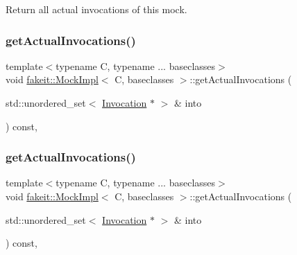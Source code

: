 Return all actual invocations of this mock. 

\mbox{\label{classfakeit_1_1MockImpl_a04c3121eb7d380226f1beabf4b18ee82}} 
\subsubsection{\texorpdfstring{getActualInvocations()}{getActualInvocations()}\hspace{0.1cm}{\footnotesize\ttfamily [2/9]}}
{\footnotesize\ttfamily template$<$typename C, typename ... baseclasses$>$ \\
void \mbox{\hyperlink{classfakeit_1_1MockImpl}{fakeit\+::\+Mock\+Impl}}$<$ C, baseclasses $>$\+::get\+Actual\+Invocations (\begin{DoxyParamCaption}\item[{std\+::unordered\+\_\+set$<$ \mbox{\hyperlink{structfakeit_1_1Invocation}{Invocation}} $\ast$ $>$ \&}]{into }\end{DoxyParamCaption}) const\hspace{0.3cm}{\ttfamily [inline]}, {\ttfamily [override]}}

\mbox{\label{classfakeit_1_1MockImpl_a04c3121eb7d380226f1beabf4b18ee82}} 
\subsubsection{\texorpdfstring{getActualInvocations()}{getActualInvocations()}\hspace{0.1cm}{\footnotesize\ttfamily [3/9]}}
{\footnotesize\ttfamily template$<$typename C, typename ... baseclasses$>$ \\
void \mbox{\hyperlink{classfakeit_1_1MockImpl}{fakeit\+::\+Mock\+Impl}}$<$ C, baseclasses $>$\+::get\+Actual\+Invocations (\begin{DoxyParamCaption}\item[{std\+::unordered\+\_\+set$<$ \mbox{\hyperlink{structfakeit_1_1Invocation}{Invocation}} $\ast$ $>$ \&}]{into }\end{DoxyParamCaption}) const\hspace{0.3cm}{\ttfamily [inline]}, {\ttfamily [override]}}

